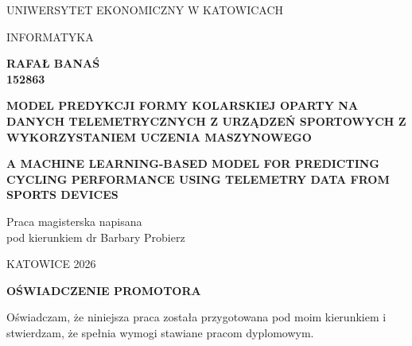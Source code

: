 
\newcommand{\thesistitlepl}{Model predykcji formy kolarskiej oparty na danych telemetrycznych z urządzeń sportowych z wykorzystaniem uczenia maszynowego}
\newcommand{\thesistitleen}{A Machine Learning-Based Model for Predicting Cycling Performance Using Telemetry Data from Sports Devices}
\newcommand{\thesisauthor}{Rafał Banaś}
\newcommand{\thesisfield}{Informatyka}
\newcommand{\thesisalbum}{152863}
\newcommand{\thesispromoter}{dr Barbary Probierz}

\pagestyle{empty}
\begin{center}
\vspace*{1.25cm}
UNIWERSYTET EKONOMICZNY W KATOWICACH

\vspace{0.65cm}
\MakeUppercase{\thesisfield}

\vspace{2.25cm}
{\bfseries \MakeUppercase{\thesisauthor}}\\
{\bfseries \thesisalbum}

\vspace{3.25cm}
{\bfseries\fontsize{18}{22}\selectfont \MakeUppercase{\thesistitlepl}\par}

\vspace{0.65cm}
{\bfseries\fontsize{13}{16}\selectfont \MakeUppercase{\thesistitleen}\par}
\end{center}

\vfill
\hfill
\begin{minipage}{0.58\textwidth}
\raggedright
Praca magisterska napisana\\
pod kierunkiem \thesispromoter
\end{minipage}

\vspace{2.3cm}
\begin{center}
KATOWICE 2026
\end{center}

\newpage 

\pagestyle{fancy}
\fancyhf{}
\renewcommand{\headrulewidth}{0pt}
\fancyfoot[R]{\thepage}

\vspace*{0.6cm}
\begin{center}
    \textbf{OŚWIADCZENIE PROMOTORA}
\end{center}

\vspace{0.45cm}
\noindent Oświadczam, że niniejsza praca została przygotowana pod moim kierunkiem i stwierdzam,
że spełnia wymogi stawiane pracom dyplomowym.

